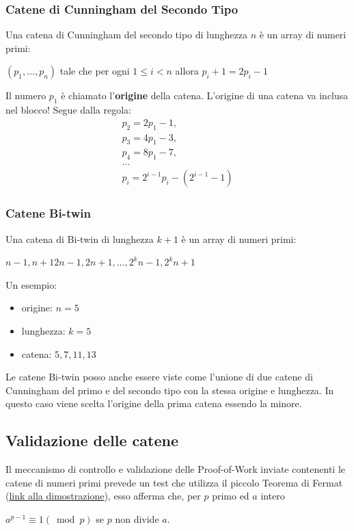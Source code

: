 \subsubsection*{Catene di Cunningham del Secondo Tipo}
Una catena di Cunningham del secondo tipo di lunghezza $n$ è un array di numeri primi:
\begin{center}
    $(p_1, \dots, p_n)$ tale che per ogni $1 \leq i < n$ allora $p_i+1 = 2p_i - 1$
\end{center}
Il numero $p_1$ è chiamato l'\textbf{origine} della catena. L'origine di una catena va inclusa nel blocco! Segue dalla regola:
\begin{equation}
\begin{split}
p_2 = 2p_1 - 1, \\
p_3 = 4p_1 - 3, \\
p_4 = 8p_1 - 7, \\  
\dots \\
p_i = 2^{i-1}p_i - ( 2^{i-1} - 1 )
\end{split}
\end{equation}

\subsubsection*{Catene Bi-twin}
Una catena di Bi-twin di lunghezza $k+1$ è un array di numeri primi:
\begin{center}
    $n-1, n+1 2n-1, 2n+1, \dots,2^kn-1, 2^kn+1$
\end{center}
 Un esempio:
\begin{itemize}
    \item origine: $n=5$
    \item lunghezza: $k=5$
    \item catena: $5,7,11,13$
\end{itemize}
Le catene Bi-twin posso anche essere viste come l'unione di due catene di Cunningham del primo e del secondo tipo con la stessa origine e lunghezza. In questo caso viene scelta l'origine della prima catena essendo la minore.
%
\subsection*{Validazione delle catene}
Il meccanismo di controllo e validazione delle Proof-of-Work inviate contenenti le catene di numeri primi prevede un test che utilizza il piccolo Teorema di Fermat (\href{http://primes.utm.edu/notes/proofs/FermatsLittleTheorem.html}{link alla dimostrazione}), esso afferma che, per $p$ primo ed $a$ intero 
\begin{center}
$a^{p-1} \equiv 1 (\bmod p)$ se $p$ non divide $a$.
\end{center}

